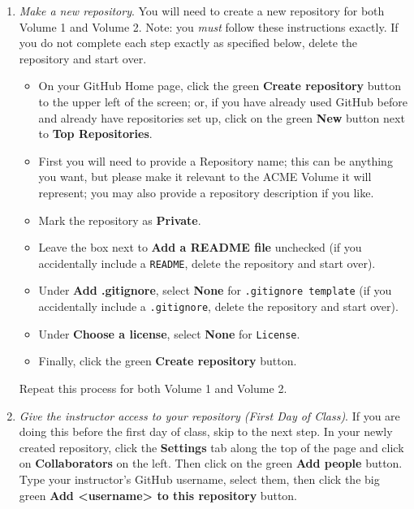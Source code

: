 \begin{enumerate}
    \item \emph{Make a new repository}.
    You will need to create a new repository for both Volume 1 and Volume 2.
    Note: you \emph{must} follow these instructions exactly. 
    If you do not complete each step exactly as specified below, delete the repository and start over.
    \begin{itemize}
        \item On your GitHub Home page, click the green \textbf{Create repository} button to the upper left of the screen; or, if you have already used GitHub before and already have repositories set up, click on the green \textbf{New} button next to \textbf{Top Repositories}.
        \item First you will need to provide a Repository name; this can be anything you want, but please make it relevant to the ACME Volume it will represent; you may also provide a repository description if you like.
        \item Mark the repository as \textbf{Private}.
        \item Leave the box next to \textbf{Add a README file} unchecked (if you accidentally include a \texttt{README}, delete the repository and start over).
        \item Under \textbf{Add .gitignore}, select \textbf{None} for \texttt{.gitignore template} (if you accidentally include a \texttt{.gitignore}, delete the repository and start over).
        \item Under \textbf{Choose a license}, select \textbf{None} for \texttt{License}.
        \item Finally, click the green \textbf{Create repository} button.
    \end{itemize}
    Repeat this process for both Volume 1 and Volume 2.
  
    \item \emph{Give the instructor access to your repository (First Day of Class)}.
    If you are doing this before the first day of class, skip to the next step.
    In your newly created repository, click the \textbf{Settings} tab along the top of the page and click on \textbf{Collaborators} on the left.
    Then click on the green \textbf{Add people} button.
    Type your instructor's GitHub username, select them, then click the big green \textbf{Add <username> to this repository} button.


\end{enumerate}
